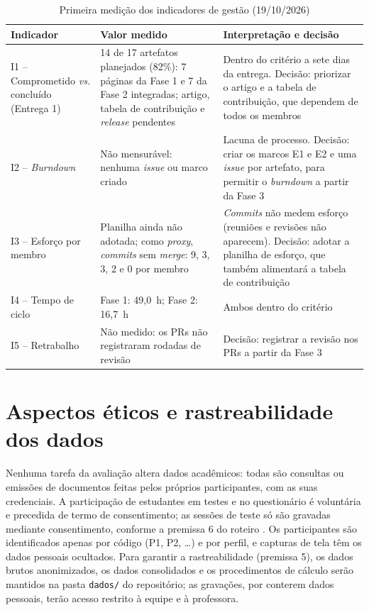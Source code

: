\begin{table}[htb]
	\caption{Primeira medição dos indicadores de gestão (19/10/2026)}
	\label{tab:psm-medicao}
	\centering
	\scriptsize
	\begin{tabularx}{\textwidth}{L{2.6cm} L{4.2cm} Y}
		\toprule
		\textbf{Indicador} & \textbf{Valor medido} & \textbf{Interpretação e decisão} \\
		\midrule
		I1 -- Comprometido \textit{vs.} concluído (Entrega 1) & 14 de 17 artefatos planejados (82\%): 7 páginas da Fase 1 e 7 da Fase 2 integradas; artigo, tabela de contribuição e \textit{release} pendentes & Dentro do critério a sete dias da entrega. Decisão: priorizar o artigo e a tabela de contribuição, que dependem de todos os membros \\
		I2 -- \textit{Burndown} & Não mensurável: nenhuma \textit{issue} ou marco criado & Lacuna de processo. Decisão: criar os marcos E1 e E2 e uma \textit{issue} por artefato, para permitir o \textit{burndown} a partir da Fase 3 \\
		I3 -- Esforço por membro & Planilha ainda não adotada; como \textit{proxy}, \textit{commits} sem \textit{merge}: 9, 3, 3, 2 e 0 por membro & \textit{Commits} não medem esforço (reuniões e revisões não aparecem). Decisão: adotar a planilha de esforço, que também alimentará a tabela de contribuição \\
		I4 -- Tempo de ciclo & Fase 1: 49,0~h; Fase 2: 16,7~h & Ambos dentro do critério \\
		I5 -- Retrabalho & Não medido: os PRs não registraram rodadas de revisão & Decisão: registrar a revisão nos PRs a partir da Fase 3 \\
		\bottomrule
	\end{tabularx}
\end{table}

\section{Aspectos éticos e rastreabilidade dos dados}
\label{sec:etica}

Nenhuma tarefa da avaliação altera dados acadêmicos: todas são consultas ou emissões de documentos feitas pelos próprios participantes, com as suas credenciais. A participação de estudantes em testes e no questionário é voluntária e precedida de termo de consentimento; as sessões de teste só são gravadas mediante consentimento, conforme a premissa 6 do roteiro \cite{ramos2026roteiro}. Os participantes são identificados apenas por código (P1, P2, \ldots) e por perfil, e capturas de tela têm os dados pessoais ocultados. Para garantir a rastreabilidade (premissa 5), os dados brutos anonimizados, os dados consolidados e os procedimentos de cálculo serão mantidos na pasta \texttt{dados/} do repositório; as gravações, por conterem dados pessoais, terão acesso restrito à equipe e à professora.

